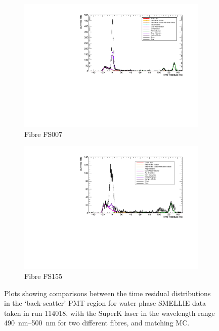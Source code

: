 \begin{figure}
    \centering
    \begin{subfigure}{0.98\textwidth}
        \centering
        \includegraphics[width=\textwidth]{4_SMELLIESimulation/images/tres_plot_backscatter_water_FS007_SUPERK490_500_data_vs_mc_tracked.pdf}
        \caption{Fibre FS007}
        \label{fig:smellie_tres_back_data_vs_mc_fs007}
    \end{subfigure}
    \begin{subfigure}{0.98\textwidth}
        \centering
        \includegraphics[width=\textwidth]{4_SMELLIESimulation/images/tres_plot_backscatter_water_FS155_SUPERK490_500_data_vs_mc_tracked.pdf}
        \caption{Fibre FS155}
        \label{fig:smellie_tres_back_data_vs_mc_fs155}
    \end{subfigure}
    \caption[Data--MC comparisons for water phase SMELLIE data in the back-scatter PMT region]
    {Plots showing comparisons between the time residual distributions in the `back-scatter' PMT region for water phase SMELLIE data taken in run \num{114018}, with the SuperK laser in the wavelength range \SIrange{490}{500}{\nm} for two different fibres, and matching MC.}
    \label{fig:smellie_tres_back_data_vs_mc_water}
\end{figure}

